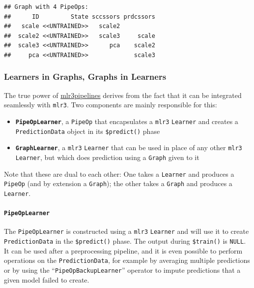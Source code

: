 \documentclass[]{article}
\providecommand{\tightlist}{%
  \setlength{\itemsep}{0pt}\setlength{\parskip}{0pt}}
\let\oldparagraph\paragraph
\renewcommand{\paragraph}[1]{\oldparagraph{#1}\mbox{}}
\begin{document}
\begin{verbatim}
## Graph with 4 PipeOps:
##      ID         State sccssors prdcssors
##   scale <<UNTRAINED>>   scale2          
##  scale2 <<UNTRAINED>>   scale3     scale
##  scale3 <<UNTRAINED>>      pca    scale2
##     pca <<UNTRAINED>>             scale3
\end{verbatim}

\hypertarget{learners-in-graphs-graphs-in-learners}{%
\subsubsection{Learners in Graphs, Graphs in Learners}\label{learners-in-graphs-graphs-in-learners}}

The true power of \href{https://cran.r-project.org/package=mlr3pipelines}{mlr3pipelines} derives from the fact that it can be integrated seamlessly with \texttt{mlr3}.
Two components are mainly responsible for this:

\begin{itemize}
\tightlist
\item
  \textbf{\texttt{PipeOpLearner}}, a \texttt{PipeOp} that encapsulates a \texttt{mlr3} \texttt{Learner} and creates a \texttt{PredictionData} object in its \texttt{\$predict()} phase
\item
  \textbf{\texttt{GraphLearner}}, a \texttt{mlr3} \texttt{Learner} that can be used in place of any other \texttt{mlr3} \texttt{Learner}, but which does prediction using a \texttt{Graph} given to it
\end{itemize}

Note that these are dual to each other: One takes a \texttt{Learner} and produces a \texttt{PipeOp} (and by extension a \texttt{Graph}); the other takes a \texttt{Graph} and produces a \texttt{Learner}.

\hypertarget{pipeoplearner}{%
\paragraph{\texorpdfstring{\texttt{PipeOpLearner}}{PipeOpLearner}}\label{pipeoplearner}}

The \texttt{PipeOpLearner} is constructed using a \texttt{mlr3} \texttt{Learner} and will use it to create \texttt{PredictionData} in the \texttt{\$predict()} phase.
The output during \texttt{\$train()} is \texttt{NULL}.
It can be used after a preprocessing pipeline, and it is even possible to perform operations on the \texttt{PredictionData}, for example by averaging multiple predictions or by using the ``\texttt{PipeOpBackupLearner}'' operator to impute predictions that a given model failed to create.
\end{document}
